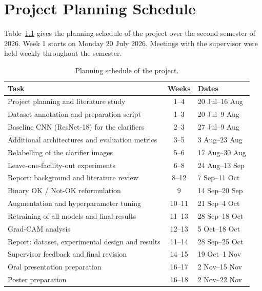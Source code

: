 \chapter{Project Planning Schedule}{}
\makeatletter{}\makeatother
\label{appen:planning_schedule}

Table~\ref{tab:planning_schedule} gives the planning schedule of the project over the second semester of 2026. Week 1 starts on Monday 20 July 2026. Meetings with the supervisor were held weekly throughout the semester.

\begin{table}[htbp]
\centering
\caption{Planning schedule of the project.}
\label{tab:planning_schedule}
{\small
\begin{tabular}{@{}lcl@{}}
\toprule
\textbf{Task} & \textbf{Weeks} & \textbf{Dates} \\
\midrule
Project planning and literature study & 1--4 & 20 Jul--16 Aug \\
Dataset annotation and preparation script & 1--3 & 20 Jul--9 Aug \\
Baseline CNN (ResNet-18) for the clarifiers & 2--3 & 27 Jul--9 Aug \\
Additional architectures and evaluation metrics & 3--5 & 3 Aug--23 Aug \\
Relabelling of the clarifier images & 5--6 & 17 Aug--30 Aug \\
Leave-one-facility-out experiments & 6--8 & 24 Aug--13 Sep \\
Report: background and literature review & 8--12 & 7 Sep--11 Oct \\
Binary OK / Not-OK reformulation & 9 & 14 Sep--20 Sep \\
Augmentation and hyperparameter tuning & 10--11 & 21 Sep--4 Oct \\
Retraining of all models and final results & 11--13 & 28 Sep--18 Oct \\
Grad-CAM analysis & 12--13 & 5 Oct--18 Oct \\
Report: dataset, experimental design and results & 11--14 & 28 Sep--25 Oct \\
Supervisor feedback and final revision & 14--15 & 19 Oct--1 Nov \\
Oral presentation preparation & 16--17 & 2 Nov--15 Nov \\
Poster preparation & 16--18 & 2 Nov--22 Nov \\
\bottomrule
\end{tabular}
}
\end{table}
